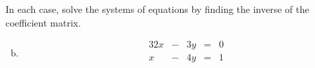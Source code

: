 \documentclass[../main.tex]{subfiles}
\begin{document}
In each case, solve the systems of equations by finding the inverse of the coefficient matrix.
\begin{enumerate}[a)]
	\setcounter{enumi}{1}
	\item 
		\begin{alignat*}{3}
			2x & {}-{} & 3y & {}={} & 0 \\
			 x & {}-{} & 4y & {}={} & 1 \\
		\end{alignat*}
\end{enumerate}
\end{document}
